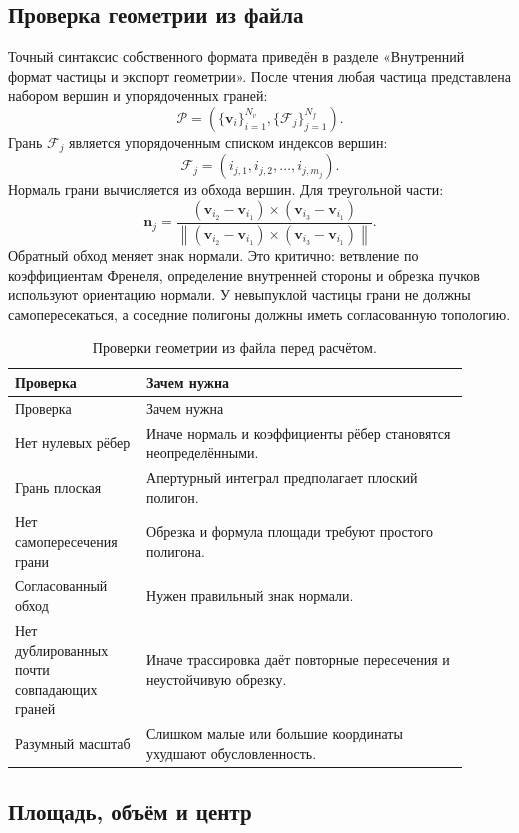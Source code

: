 \documentclass[11pt,a4paper]{article}
\newcommand{\vect}[1]{\symbf{#1}}
\newcommand{\norm}[1]{\left\lVert #1 \right\rVert}
\begin{document}
\subsection{Проверка геометрии из файла}

Точный синтаксис собственного формата приведён в разделе «Внутренний формат
частицы и экспорт геометрии». После чтения любая частица представлена набором
вершин и упорядоченных граней:
\[
  \mathcal P=
  \left(
  \{\vect v_i\}_{i=1}^{N_v},
  \{\mathcal F_j\}_{j=1}^{N_f}
  \right).
\]
Грань $\mathcal F_j$ является упорядоченным списком индексов вершин:
\[
  \mathcal F_j=(i_{j,1},i_{j,2},\ldots,i_{j,m_j}).
\]
Нормаль грани вычисляется из обхода вершин. Для треугольной части:
\[
  \vect n_j=
  \frac{(\vect v_{i_2}-\vect v_{i_1})\times
        (\vect v_{i_3}-\vect v_{i_1})}
       {\norm{(\vect v_{i_2}-\vect v_{i_1})\times
        (\vect v_{i_3}-\vect v_{i_1})}}.
\]
Обратный обход меняет знак нормали. Это критично: ветвление по коэффициентам
Френеля, определение внутренней стороны и обрезка пучков используют ориентацию
нормали. У невыпуклой частицы грани не должны самопересекаться, а соседние
полигоны должны иметь согласованную топологию.

\begin{longtable}{L{0.26\linewidth} L{0.64\linewidth}}
\caption{Проверки геометрии из файла перед расчётом.}\\
\toprule
Проверка & Зачем нужна \\
\midrule
\endfirsthead
\toprule
Проверка & Зачем нужна \\
\midrule
\endhead
Нет нулевых рёбер & Иначе нормаль и коэффициенты рёбер становятся неопределёнными. \\
Грань плоская & Апертурный интеграл предполагает плоский полигон. \\
Нет самопересечения грани & Обрезка и формула площади требуют простого полигона. \\
Согласованный обход & Нужен правильный знак нормали. \\
Нет дублированных почти совпадающих граней & Иначе трассировка даёт повторные пересечения и неустойчивую обрезку. \\
Разумный масштаб & Слишком малые или большие координаты ухудшают обусловленность. \\
\bottomrule
\end{longtable}

\subsection{Площадь, объём и центр}
\end{document}
